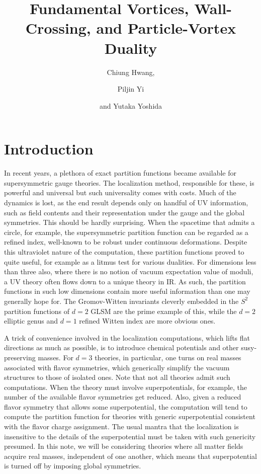 \documentclass[a4paper,11pt]{article}
\title{Fundamental Vortices, Wall-Crossing, and Particle-Vortex Duality}
\author[a]{Chiung Hwang,}
\author[a]{Piljin Yi}
\author[b]{and Yutaka Yoshida}
\affiliation[a]{School of Physics, Korea Institute for Advanced Study, \\
Seoul 02455, Korea}
\affiliation[b]{Research Institute for Mathematical Sciences, Kyoto University, \\
Kyoto 606-8502, Japan}
\begin{document}
\maketitle
\flushbottom

\section{Introduction}

In recent years, a plethora of exact partition functions became
available for supersymmetric gauge theories. The localization method,
responsible for these, is powerful and universal but such
universality comes with costs. Much of the dynamics is lost,
as the end result depends only on handful of UV information,
such as field contents and their representation under the
gauge and the global symmetries. This should be hardly surprising.
When the spacetime that admits a circle, for example, the
supersymmetric partition function can be regarded as a refined
index, well-known to be robust under continuous deformations.
Despite this ultraviolet nature of the computation, these
partition functions proved to quite useful, for example as a
litmus test for various dualities.
For dimensions less than three also, where there is no notion of
vacuum expectation value of moduli, a UV theory often flows
down to a unique theory in IR. As such, the partition functions
in such low dimensions contain more useful information
than one may generally hope for. The Gromov-Witten invariants
cleverly embedded \cite{Jockers:2012dk,Gomis:2012wy}
in the $S^2$ partition functions \cite{Benini:2012ui,Doroud:2012xw}
of $d=2$ GLSM are the prime example of this, while the
$d=2$ elliptic genus \cite{Benini:2013xpa} and $d=1$  refined
Witten index \cite{Hori:2014tda} are more obvious ones.

A trick of convenience involved in the localization
computations, which lifts flat directions as much as possible,
is to introduce chemical potentials and other susy-preserving
masses. For $d=3$ theories, in particular, one
turns on real masses associated with flavor symmetries, which
generically simplify the vacuum structures to those of isolated
ones. Note that not all theories
admit such computations. When the theory must involve
superpotentials, for example, the number of the available
flavor symmetries get reduced. Also, given a reduced flavor
symmetry that allows some superpotential, the computation will
tend to compute the partition function for theories with
generic superpotential consistent with the flavor charge
assignment. The usual mantra that the localization is
insensitive to the details of the superpotential must be
taken with such genericity presumed. In this note, we will
be considering theories where all matter fields acquire
real masses, independent of one another, which means that
superpotential is turned off by imposing global symmetries.
\end{document}
